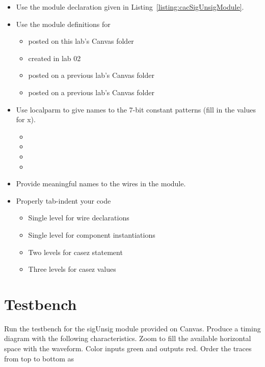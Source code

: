 \begin{itemize}
\item
  Use the module declaration given in Listing~\ref{listing:cacSigUnsigModule}.
\item
  Use the module definitions for

  \begin{itemize}
  \item
     posted on this lab's Canvas folder
  \item
     created in lab 02
  \item
     posted on a previous lab's Canvas folder
  \item
     posted on a previous lab's Canvas folder
  \end{itemize}
\item
  Use localparm to give names to the 7-bit constant patterns (fill in
  the values for x).

  \begin{itemize}
  \item
  \item
  \item
  \item
  \end{itemize}
\item
  Provide meaningful names to the wires in the module.
\item
  Properly tab-indent your code

  \begin{itemize}
  \item
    Single level for wire declarations
  \item
    Single level for component instantiations
  \item
    Two levels for casez statement
  \item
    Three levels for casez values
  \end{itemize}
\end{itemize}

\section{Testbench}
\label{section:calcTestbench}
  Run the testbench for the sigUnsig module provided on Canvas. Produce
  a timing diagram with the following characteristics. Zoom to fill the
  available horizontal space with the waveform. Color inputs green and
  outputs red. Order the traces from top to bottom as

